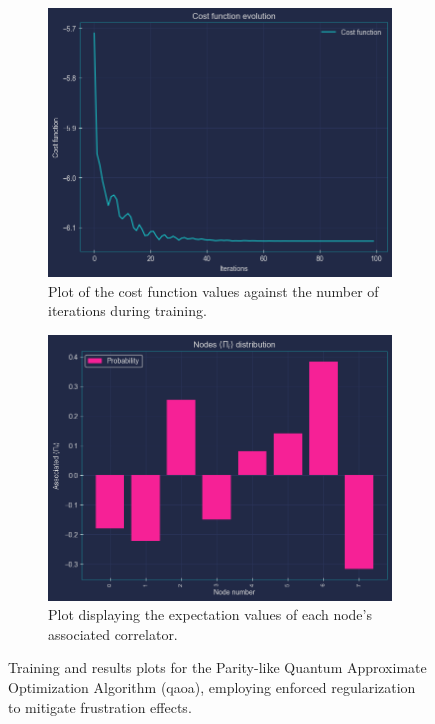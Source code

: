 \begin{figure}[ht!]
    \centering
    \begin{subfigure}[t]{0.495\textwidth}
        \centering
        \includegraphics[width=1\textwidth,height=0.75\textwidth]{Figures/Chapter_6/Parity QAOA + Restrictions/Parity+Restriction_Training.png}
        \caption{Plot of the cost function values against the number of iterations during training.}
        \label{fig:Parity+Restriction_Training}
    \end{subfigure}
    \hfill
    \begin{subfigure}[t]{0.495\textwidth}
        \centering
        \includegraphics[width=1\textwidth,height=0.75\textwidth]{Figures/Chapter_6/Parity QAOA + Restrictions/Parity+Restriction_Results.png}
        \caption{Plot displaying the expectation values of each node's associated correlator.}
        \label{fig:Parity+Restriction_Results}
    \end{subfigure}
    \caption{Training and results plots for the Parity-like Quantum Approximate Optimization Algorithm (\acrshort{qaoa}), employing enforced regularization to mitigate frustration effects.}
    \label{fig:Parity+Restriction}
\end{figure}

